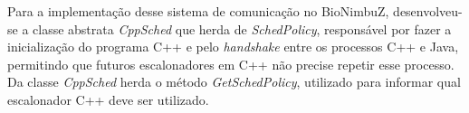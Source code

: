 Para a implementação desse sistema de comunicação no BioNimbuZ, desenvolveu-se a classe abstrata \textit{CppSched} que herda de \textit{SchedPolicy}, responsável por fazer a inicialização do programa C++ e pelo \textit{handshake} entre os processos C++ e Java, permitindo que futuros escalonadores em C++ não precise repetir esse processo. Da classe \textit{CppSched} herda o método \textit{GetSchedPolicy}, utilizado para informar qual escalonador C++ deve ser utilizado.

 


